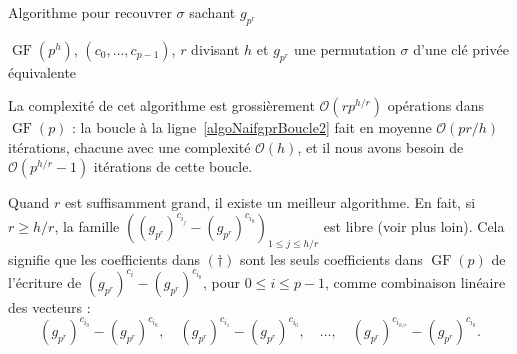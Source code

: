 \documentclass[a4paper, titlepage]{article}
\theoremstyle{definition}
\theoremstyle{remark}
\def\O{\mathcal O}
\def\gf{\operatorname{GF}}
\begin{document}
\begin{algorithm}[h]
\caption{Algorithme pour recouvrer $\sigma$ sachant $g_{p^r}$}
\label{algoNaifgpr}
\begin{algorithmic}[1]
\REQUIRE $\gf(p^h)$, $(c_0,\dots, c_{p-1})$, $r$ divisant $h$ et $g_{p^r}$
\ENSURE une permutation $\sigma$ d'une clé privée équivalente
 \label{algoNaifgprBoucle}
	 \label{algoNaifgprBoucle2}
		\ELSE
		\ENDIF
	\ENDFOR
	\RETURN{$\sigma$}
\ENDFOR
\end{algorithmic}
\end{algorithm}

La complexité de cet algorithme est grossièrement $\O(rp^{h/r})$ opérations dans $\gf(p)$ : la boucle à la ligne~\ref{algoNaifgprBoucle2} fait en moyenne $\O(pr/h)$ itérations, chacune avec une complexité $\O(h)$, et il nous avons besoin de $\O(p^{h/r}-1)$ itérations de cette boucle.

Quand $r$ est suffisamment grand, il existe un meilleur algorithme. En fait, si $r \geqslant h/r$, la famille $\left((g_{p^r})^{c_{i_j}} - (g_{p^r})^{c_{i_0}} \right)_{1\leqslant j \leqslant h/r}$ est libre (voir plus loin). Cela signifie que les coefficients dans $(\dagger)$ sont les seuls coefficients dans $\gf(p)$ de l'écriture de $(g_{p^r})^{c_{i}} - (g_{p^r})^{c_{i_0}}$, pour $0\leqslant i \leqslant p-1$, comme combinaison linéaire des vecteurs : $$(g_{p^r})^{c_{i_0}} - (g_{p^r})^{c_{i_0}}, \quad (g_{p^r})^{c_{i_1}} - (g_{p^r})^{c_{i_0}},\quad \dots,\quad (g_{p^r})^{c_{i_{h/r}}} - (g_{p^r})^{c_{i_0}}.$$
\end{document}

